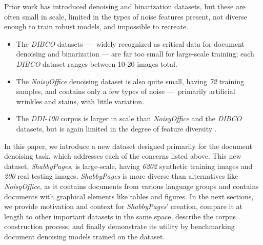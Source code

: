 \documentclass[runningheads]{llncs}
\begin{document}
Prior work has introduced denoising and binarization datasets, but these are often small in scale, limited in the types of noise features present, not diverse enough to train robust models, and impossible to recreate.
\begin{itemize}
\item The \emph{DIBCO} datasets — widely recognized as critical data for document denoising and binarization — are far too small for large-scale training; each \emph{DIBCO} dataset ranges between 10-20 images total.
\item The \emph{NoisyOffice} denoising dataset \cite{ref_NoisyOfficeDatabase} is also quite small, having \emph{72} training samples, and contains only a few types of noise — primarily artificial wrinkles and stains, with little variation.
\item The \emph{DDI-100} corpus \cite{ddi-100-2019} is larger in scale than \emph{NoisyOffice} and the \emph{DIBCO} datasets, but is again limited in the degree of feature diversity \cite{detection-masking-2022}.
\end{itemize}

In this paper, we introduce a new dataset designed primarily for the document denoising task, which addresses each of the concerns listed above.
This new dataset, \emph{ShabbyPages}, is large-scale, having \emph{6202} synthetic training images and \emph{200} real testing images.
\emph{ShabbyPages} is more diverse than alternatives like \emph{NoisyOffice}, as it contains documents from various language groups and contains documents with graphical elements like tables and figures.
In the next sections, we provide motivation and context for \emph{ShabbyPages}' creation, compare it at length to other important datasets in the same space, describe the corpus construction process, and finally demonstrate its utility by benchmarking document denoising models trained on the dataset.
\end{document}

